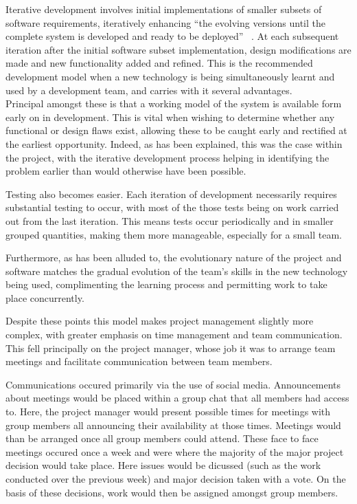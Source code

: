 \documentclass[12pt,a4paper]{report}
\begin{document}
Iterative development involves initial implementations of smaller subsets of software requirements, iteratively enhancing ``the evolving versions until the complete system is developed and ready to be deployed'' ~\cite{itDev}. At each subsequent iteration after the initial software subset implementation, design modifications are made and new functionality added and refined. This is the recommended development model when a new technology is being simultaneously learnt and used by a development team, and carries with it several advantages.\\

Principal amongst these is that a working model of the system is available form early on in development. This is vital when wishing to determine whether any functional or design flaws exist, allowing these to be caught early and rectified at the earliest opportunity. Indeed, as has been explained, this was the case within the project, with the iterative development process helping in identifying the problem earlier than would otherwise have been possible.

Testing also becomes easier. Each iteration of development necessarily requires substantial testing to occur, with most of the those tests being on work carried out from the last iteration. This means tests occur periodically and in smaller grouped quantities, making them more manageable, especially for a small team.

Furthermore, as has been alluded to, the evolutionary nature of the project and software matches the gradual evolution of the team's skills in the new technology being used, complimenting the learning process and permitting work to take place concurrently.

Despite these points this model makes project management slightly more complex, with greater emphasis on time management and team communication. This fell principally on the project manager, whose job it was to arrange team meetings and facilitate communication between team members.

Communications occured primarily via the use of social media. Announcements about meetings would be placed within a group chat that all members had access to. Here, the project manager would present possible times for meetings with group members all announcing their availability at those times. Meetings would than be arranged once all group members could attend. These face to face meetings occured once a week and were where the majority of the major project decision would take place. Here issues would be dicussed (such as the work conducted over the previous week) and major decision taken with a vote. On the basis of these decisions, work would then be assigned amongst group members.
\end{document}
